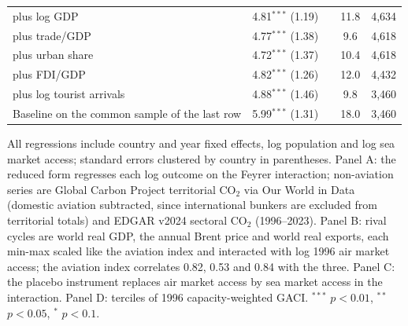 \documentclass[12pt]{article}
\begin{document}
\begin{table}[htbp]
\begin{threeparttable}
\begin{tabular}{lcccc}
  \quad plus log GDP & 4.81$^{***}$ (1.19) & & 11.8 & 4,634 \\
  \quad plus trade/GDP & 4.77$^{***}$ (1.38) & & 9.6 & 4,618 \\
  \quad plus urban share & 4.72$^{***}$ (1.37) & & 10.4 & 4,618 \\
  \quad plus FDI/GDP & 4.82$^{***}$ (1.26) & & 12.0 & 4,432 \\
  \quad plus log tourist arrivals & 4.88$^{***}$ (1.46) & & 9.8 & 3,460 \\
  Baseline on the common sample of the last row & 5.99$^{***}$ (1.31) & & 18.0 & 3,460 \\
\bottomrule
\end{tabular}
\begin{tablenotes}\scriptsize
\item All regressions include country and year fixed effects, log population and log sea market access; standard errors clustered by country in parentheses. Panel A: the reduced form regresses each log outcome on the Feyrer interaction; non-aviation series are Global Carbon Project territorial CO$_2$ via Our World in Data (domestic aviation subtracted, since international bunkers are excluded from territorial totals) and EDGAR v2024 sectoral CO$_2$ (1996--2023). Panel B: rival cycles are world real GDP, the annual Brent price and world real exports, each min-max scaled like the aviation index and interacted with log 1996 air market access; the aviation index correlates 0.82, 0.53 and 0.84 with the three. Panel C: the placebo instrument replaces air market access by sea market access in the interaction. Panel D: terciles of 1996 capacity-weighted GACI. $^{***}$ $p<0.01$, $^{**}$ $p<0.05$, $^{*}$ $p<0.1$.
\end{tablenotes}
\end{threeparttable}
\end{table}
\end{document}
